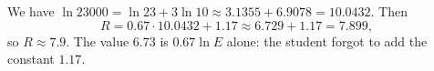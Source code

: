 We have $\ln23000=\ln23+3\ln10\approx3.1355+6.9078=10.0432$. Then
\[
R=0.67\cdot10.0432+1.17\approx6.729+1.17=7.899,
\]
so $R\approx\boxed{7.9}$. The value $6.73$ is $0.67\ln E$ alone: the student forgot to add the constant $1.17$.
